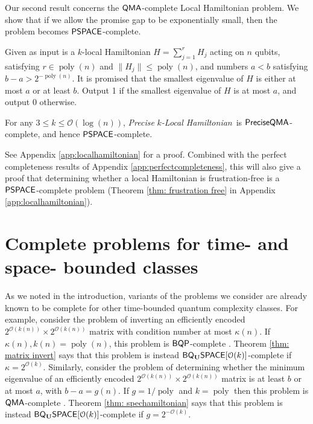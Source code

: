 \documentclass[a4paper,UKenglish]{lipics-v2016}
\newcommand\QMA{{\sf{QMA}}}
\newcommand\PSPACE{{\sf{PSPACE}}}
\newcommand\BQP{{\sf{BQP}}}
\newcommand\preciseQMA{{\sf{PreciseQMA}}}
\newcommand\preciseklh{\textit{Precise }$k$\textit{-Local Hamiltonian}}
\newcommand{\classfont}{\sf}
\newcommand{\Unitary}{\mathbf{U}}
\newcommand{\unitaryBQSPACE}[1]{{\classfont{BQ}_\Unitary\classfont{SPACE}}[#1]}
\newcommand\bigoh{\mathcal{O}}
\DeclareMathOperator{\poly}{poly}
\begin{document}
Our second result concerns the $\QMA$-complete Local Hamiltonian problem. We show that if we allow the promise gap to be exponentially small, then the problem becomes $\PSPACE$-complete. 
\begin{definition}[\preciseklh]\label{def: precise local hamiltonian}
Given as input is a $k$-local Hamiltonian $H=\sum_{j=1}^rH_j$ acting on $n$ qubits, satisfying $r \in \poly(n)$ and $\|H_j\| \le \poly(n)$, and numbers $a < b$ satisfying $b - a > 2^{-\poly(n)}$. It is promised that the smallest eigenvalue of $H$ is either at most $a$ or at least $b$. Output 1 if the smallest eigenvalue of $H$ is at most $a$, and output 0 otherwise.
\end{definition}
\begin{theorem} \label{thm: precise local hamiltonian}
For any $3 \le k \le \mathcal{O}(\log(n))$, \preciseklh \ is $\preciseQMA$-complete, and hence $\PSPACE$-complete.
\end{theorem}
See Appendix \ref{app:localhamiltonian} for a proof. Combined with the perfect completeness results of Appendix \ref{app:perfectcompleteness}, this will also give a proof that determining whether a local Hamiltonian is frustration-free is a $\PSPACE$-complete problem (Theorem \ref{thm: frustration free} in Appendix \ref{app:localhamiltonian}).

\section{Complete problems for time- and space- bounded classes} \label{sec: time and space}
As we noted in the introduction, variants of the problems we consider are already known to be complete for other time-bounded quantum complexity classes. 
For example, consider the problem of inverting an efficiently encoded $2^{\bigoh(k(n))} \times 2^{\bigoh(k(n))}$ matrix with condition number at most $\kappa(n)$. If $\kappa(n), k(n) = \poly(n)$, this problem is $\BQP$-complete \cite{HHL}. Theorem \ref {thm: matrix invert} says that this problem is instead $\unitaryBQSPACE{\bigoh(k)}$-complete if $\kappa = 2^{\bigoh(k)}$. 
Similarly, consider the problem of determining whether the minimum eigenvalue of an efficiently encoded $2^{\bigoh(k(n))} \times 2^{\bigoh(k(n))}$ matrix is at least $b$ or at most $a$, with $b-a=g(n)$. If $g = 1/\poly$ and $k = \poly$ then this problem is $\QMA$-complete \cite{ksv02,at03}. Theorem \ref{thm: spechamiltonian} says that this problem is instead $\unitaryBQSPACE{\bigoh(k)}$-complete if $g = 2^{-\bigoh(k)}$. 
\end{document}
